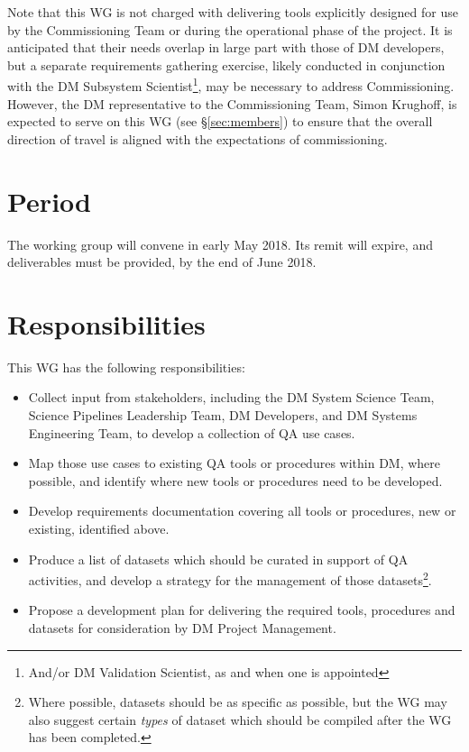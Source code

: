 \documentclass[DM,toc]{lsstdoc}
\begin{document}
Note that this WG is not charged with delivering tools explicitly designed for
use by the Commissioning Team or during the operational phase of the project.
It is anticipated that their needs overlap in large part with those of DM
developers, but a separate requirements gathering exercise, likely conducted
in conjunction with the DM Subsystem Scientist\footnote{And/or DM Validation
Scientist, as and when one is appointed}, may be necessary to address
Commissioning. However, the DM representative to the Commissioning Team, Simon
Krughoff, is expected to serve on this WG (see \S\ref{sec:members}) to ensure
that the overall direction of travel is aligned with the expectations of
commissioning.

\section{Period}
\label{sec:period}

The working group will convene in early May 2018. Its remit will expire, and
deliverables must be provided, by the end of June 2018.

\section{Responsibilities}

This WG has the following responsibilities:

\begin{itemize}

  \item{Collect input from stakeholders, including the DM System Science Team,
  Science Pipelines Leadership Team, DM Developers, and DM Systems Engineering
  Team, to develop a collection of QA use cases.}

  \item{Map those use cases to existing QA tools or procedures within DM,
  where possible, and identify where new tools or procedures need to be
  developed.}

  \item{Develop requirements documentation covering all tools or procedures,
  new or existing, identified above.}

  \item{Produce a list of datasets which should be curated in support of QA
  activities, and develop a strategy for the management of those
  datasets\footnote{Where possible, datasets should be as specific as
  possible, but the WG may also suggest certain \textit{types} of dataset
  which should be compiled after the WG has been completed.}.}

  \item{Propose a development plan for delivering the required tools,
  procedures and datasets for consideration by DM Project Management.}

\end{itemize}
\end{document}
